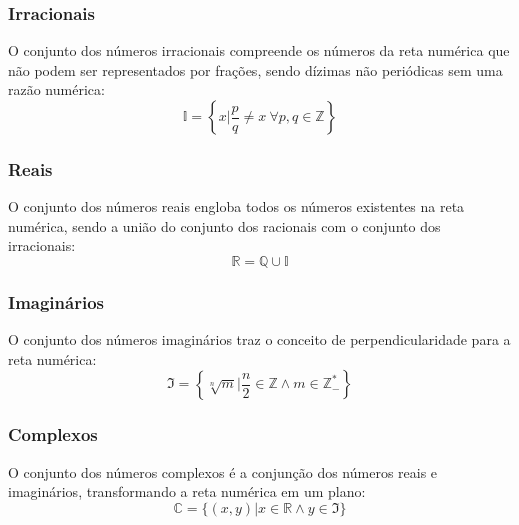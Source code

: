     \subsubsection{Irracionais}
        O conjunto dos números irracionais compreende os números da reta numérica que não podem ser representados por frações, sendo dízimas não periódicas sem uma razão numérica:
        \[ \mathbb{I} = \left\{ x | \frac{p}{q} \neq x \ \forall p,q \in \mathbb{Z} \right\} \]
    \subsubsection{Reais}
        O conjunto dos números reais engloba todos os números existentes na reta numérica, sendo a união do conjunto dos racionais com o conjunto dos irracionais:
        \[ \mathbb{R} = \mathbb{Q} \cup \mathbb{I} \]
    \subsubsection{Imaginários}
        O conjunto dos números imaginários traz o conceito de perpendicularidade para a reta numérica:
        \[ \mathfrak{I} = \left\{ \sqrt[n]{m} | \frac{n}{2} \in \mathbb{Z} \wedge m \in \mathbb{Z}^*_- \right\} \]
    \subsubsection{Complexos}
        O conjunto dos números complexos é a conjunção dos números reais e imaginários, transformando a reta numérica em um plano:
        \[ \mathbb{C} = \{ (x,y) | x \in \mathbb{R} \wedge y \in \mathfrak{I} \} \]